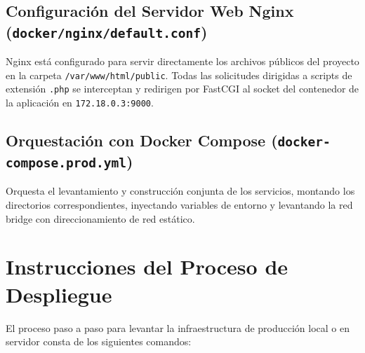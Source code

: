 \subsection{Configuración del Servidor Web Nginx (\texttt{docker/nginx/default.conf})}
Nginx está configurado para servir directamente los archivos públicos del proyecto en la carpeta \texttt{/var/www/html/public}. Todas las solicitudes dirigidas a scripts de extensión \texttt{.php} se interceptan y redirigen por FastCGI al socket del contenedor de la aplicación en \texttt{172.18.0.3:9000}.

\subsection{Orquestación con Docker Compose (\texttt{docker-compose.prod.yml})}
Orquesta el levantamiento y construcción conjunta de los servicios, montando los directorios correspondientes, inyectando variables de entorno y levantando la red bridge con direccionamiento de red estático.

\section{Instrucciones del Proceso de Despliegue}
El proceso paso a paso para levantar la infraestructura de producción local o en servidor consta de los siguientes comandos:

